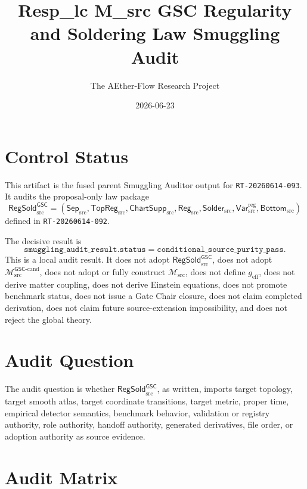 \documentclass[11pt]{article}
\title{Resp\_lc M\_src GSC Regularity and Soldering Law Smuggling Audit}
\author{The AEther-Flow Research Project}
\date{2026-06-23}
\newcommand{\Msrc}{\mathcal{M}_{\mathrm{src}}}
\newcommand{\Mgsccand}{\mathcal{M}_{\mathrm{src}}^{\mathsf{GSC}\text{-}\mathrm{cand}}}
\newcommand{\geff}{g_{\mathrm{eff}}}
\newcommand{\RegSold}{\mathsf{RegSold}_{\mathrm{src}}^{\mathsf{GSC}}}
\newcommand{\SepSrc}{\mathsf{Sep}_{\mathrm{src}}}
\newcommand{\TopRegSrc}{\mathsf{TopReg}_{\mathrm{src}}}
\newcommand{\ChartSuppSrc}{\mathsf{ChartSupp}_{\mathrm{src}}}
\newcommand{\RegSrc}{\mathsf{Reg}_{\mathrm{src}}}
\newcommand{\SolderSrc}{\mathsf{Solder}_{\mathrm{src}}}
\newcommand{\VarRegSrc}{\mathsf{Var}^{\mathrm{reg}}_{\mathrm{src}}}
\newcommand{\BottomSrc}{\mathsf{Bottom}_{\mathrm{src}}}
\begin{document}
\maketitle

\section*{Control Status}

This artifact is the fused parent Smuggling Auditor output for
\texttt{RT-20260614-093}. It audits the proposal-only law package
\[
  \RegSold =
  (\SepSrc,\TopRegSrc,\ChartSuppSrc,\RegSrc,\SolderSrc,\VarRegSrc,\BottomSrc)
\]
defined in \texttt{RT-20260614-092}.

The decisive result is
\[
  \texttt{smuggling\_audit\_result.status}
  =
  \texttt{conditional\_source\_purity\_pass}.
\]
This is a local audit result. It does not adopt \(\RegSold\), does not adopt
\(\Mgsccand\), does not adopt or fully construct \(\Msrc\), does not define
\(\geff\), does not derive matter coupling, does not derive Einstein
equations, does not promote benchmark status, does not issue a Gate Chair
closure, does not claim completed derivation, does not claim future
source-extension impossibility, and does not reject the global theory.

\section{Audit Question}

The audit question is whether \(\RegSold\), as written, imports target
topology, target smooth atlas, target coordinate transitions, target metric,
proper time, empirical detector semantics, benchmark behavior, validation or
registry authority, role authority, handoff authority, generated derivatives,
file order, or adoption authority as source evidence.

\section{Audit Matrix}
\end{document}
